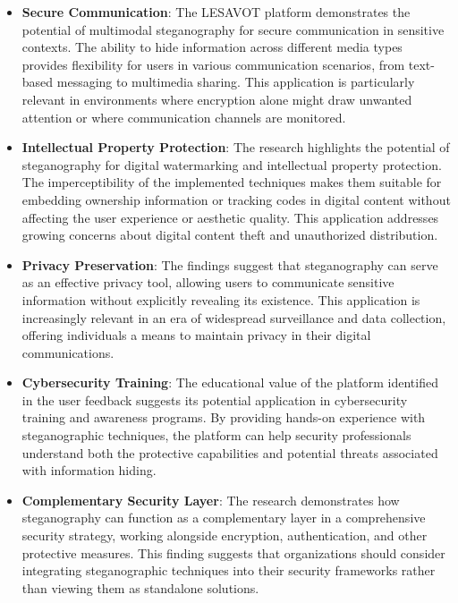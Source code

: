 \documentclass[12pt, a4paper, oneside]{book}
\begin{document}
\begin{itemize}[leftmargin=*]
    \item \textbf{Secure Communication}: The LESAVOT platform demonstrates the potential of multimodal steganography for secure communication in sensitive contexts. The ability to hide information across different media types provides flexibility for users in various communication scenarios, from text-based messaging to multimedia sharing. This application is particularly relevant in environments where encryption alone might draw unwanted attention or where communication channels are monitored.

    \item \textbf{Intellectual Property Protection}: The research highlights the potential of steganography for digital watermarking and intellectual property protection. The imperceptibility of the implemented techniques makes them suitable for embedding ownership information or tracking codes in digital content without affecting the user experience or aesthetic quality. This application addresses growing concerns about digital content theft and unauthorized distribution.

    \item \textbf{Privacy Preservation}: The findings suggest that steganography can serve as an effective privacy tool, allowing users to communicate sensitive information without explicitly revealing its existence. This application is increasingly relevant in an era of widespread surveillance and data collection, offering individuals a means to maintain privacy in their digital communications.

    \item \textbf{Cybersecurity Training}: The educational value of the platform identified in the user feedback suggests its potential application in cybersecurity training and awareness programs. By providing hands-on experience with steganographic techniques, the platform can help security professionals understand both the protective capabilities and potential threats associated with information hiding.

    \item \textbf{Complementary Security Layer}: The research demonstrates how steganography can function as a complementary layer in a comprehensive security strategy, working alongside encryption, authentication, and other protective measures. This finding suggests that organizations should consider integrating steganographic techniques into their security frameworks rather than viewing them as standalone solutions.
\end{itemize}
\end{document}
